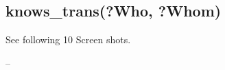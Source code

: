 \documentclass[letterpaper,10pt,english]{sphinxmanual}
\begin{document}
\subsection{knows\_trans(?Who, ?Whom)}
\label{assign3:knows-trans-who-whom}
See following 10 Screen shots.
\begin{figure}[htbp]
\centering

\end{figure}

--
\begin{figure}[htbp]
\centering

\end{figure}
\end{document}

